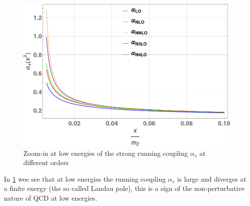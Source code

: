 \documentclass[../Tesi_Jiahao_Miao_986136.tex]{subfiles}
\begin{document}
\begin{figure}[htbp] 
    \centering
    \includegraphics[width=\textwidth]{figures/alpha_zoom.png}
    \caption{Zoom-in at low energies of the strong running coupling $\alpha_s$ at different orders}
    \label{fig:alpha_zoom}
\end{figure}

In \cref{fig:alpha_zoom} wee see that at low energies the running coupling $\alpha_s$ is large and diverges at a finite 
energy (the so called Landau pole), this is a sign of the non-perturbative nature of QCD at low energies.
\end{document}
